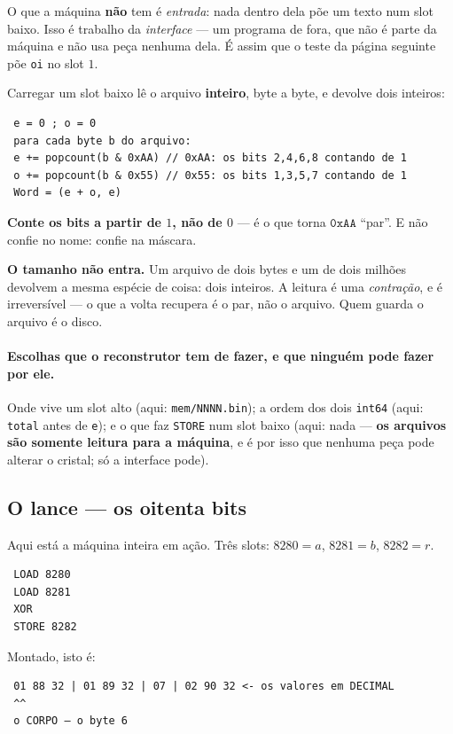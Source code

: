 \documentclass[11pt]{article}
\newcommand{\code}[1]{\texttt{\small #1}}
\theoremstyle{plain}
\theoremstyle{remark}
\begin{document}
\medskip
\noindent O que a máquina \textbf{não} tem é \emph{entrada}: nada dentro dela
põe um texto num slot baixo. Isso é trabalho da \emph{interface} --- um programa
de fora, que não é parte da máquina e não usa peça nenhuma dela. É assim que o
teste da página seguinte põe \code{oi} no slot $1$.

\noindent Carregar um slot baixo lê o arquivo \textbf{inteiro}, byte a byte, e
devolve dois inteiros:

\begin{verbatim}
 e = 0 ; o = 0
 para cada byte b do arquivo:
 e += popcount(b & 0xAA) // 0xAA: os bits 2,4,6,8 contando de 1
 o += popcount(b & 0x55) // 0x55: os bits 1,3,5,7 contando de 1
 Word = (e + o, e)
\end{verbatim}

\noindent \textbf{Conte os bits a partir de $1$, não de $0$} --- é o que torna
$\mathtt{0xAA}$ ``par''. E não confie no nome: confie na máscara.

\noindent \textbf{O tamanho não entra.} Um arquivo de dois bytes e um de dois
milhões devolvem a mesma espécie de coisa: dois inteiros. A leitura é uma
\emph{contração}, e é irreversível --- o que a volta recupera é o par, não o
arquivo. Quem guarda o arquivo é o disco.

\paragraph{Escolhas que o reconstrutor tem de fazer, e que ninguém pode fazer
por ele.} Onde vive um slot alto (aqui: \code{mem/NNNN.bin}); a ordem dos dois
\code{int64} (aqui: \code{total} antes de \code{e}); e o que faz \code{STORE}
num slot baixo (aqui: nada --- \textbf{os arquivos são somente leitura para a
máquina}, e é por isso que nenhuma peça pode alterar o cristal; só a interface
pode).

\subsection{O lance --- os oitenta bits}

Aqui está a máquina inteira em ação. Três slots: $8280=a$, $8281=b$,
$8282=r$.

\begin{verbatim}
 LOAD 8280
 LOAD 8281
 XOR
 STORE 8282
\end{verbatim}

\noindent Montado, isto é:

\begin{verbatim}
 01 88 32 | 01 89 32 | 07 | 02 90 32 <- os valores em DECIMAL
 ^^
 o CORPO — o byte 6
\end{verbatim}
\end{document}
